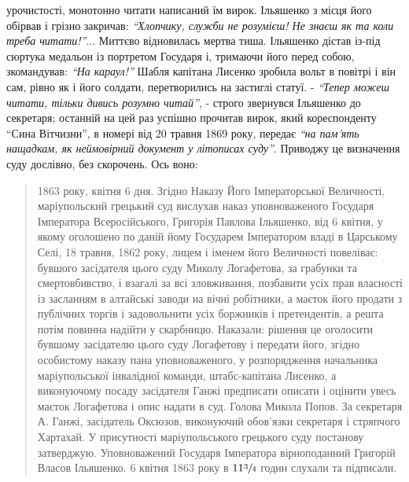 \documentclass[a4paper,20pt]{report}
\begin{document}
урочистості, монотонно читати написаний їм вирок. Ільяшенко з місця його
обірвав і грізно закричав: \emph{``Хлопчику, служби не розумієш! Не знаєш як та
коли треба читати!''}...  Миттєво відновилась мертва тиша. Ільяшенко дістав
із-під сюртука медальон із портретом Государя і, тримаючи його перед собою,
зкомандував: \emph{``На караул!''} Шабля капітана Лисенко зробила вольт в повітрі і
він сам, рівно як і його солдати, перетворились на застиглі статуї. -
\emph{``Тепер можеш читати, тільки дивись розумно читай''}, - строго звернувся
Ільяшенко до секретаря; останній на цей раз успішно прочитав вирок, який
кореспонденту ``Сина Вітчизни'', в номері від 20 травня 1869 року, передає
\emph{``на пам'ять нащадкам, як неймовірний документ у літописах суду''}.
Приводжу це визначення суду дослівно, без скорочень. Ось воно:
\begin{quote}
\em\bfseries

1863 року, квітня 6 дня. Згідно Наказу Його Імператорської Величності,
маріупольский грецький суд вислухав наказ уповноваженого Государя
Імператора Всеросійського, Григорія Павлова Ільяшенко, від 6 квітня, у
якому оголошено по даній йому Государем Імператором владі в Царському
Селі, 18 травня, 1862 року, лицем і іменем його Величності повеліває:
бувшого засідателя цього суду Миколу Логафетова, за грабунки та
смертовбивство, і взагалі за всі зловживання, позбавити усіх прав
власності із засланням в алтайські заводи на вічні робітники, а маєток
його продати з публічних торгів і задовольнити усіх боржників і
претендентів, а решта потім повинна надійти у скарбницю. Наказали:
рішення це оголосити бувшому засідателю цього суду Логафетову і
передати його, згідно особистому наказу пана уповноваженого, у
розпорядження начальника маріупольської інвалідної команди,
штабс-капітана Лисенко, а виконуючому посаду засідателя Ганжі
предписати описати і оцінити увесь маєток Логафетова і опис надати в
суд. Голова Микола Попов. За секретаря А. Ганжі, засідатель Оксюзов,
виконуючий обов'язки секретаря і стряпчого Хартахай. У присутності
маріупольського грецького суду постанову затверджую. Уповноважений
Государя Імператора вірноподанний Григорій Власов Ільяшенко. 6 квітня
1863 року в $11 \sfrac{3}{4}$ годин слухали та підписали. 
\end{quote}
\end{document}
